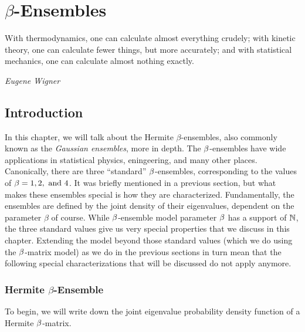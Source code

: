 
\chapter{$\beta$-Ensembles}

\epigraph{With thermodynamics, one can calculate almost everything crudely; with kinetic theory, one can calculate fewer things, but more accurately;
and with statistical mechanics, one can calculate almost nothing exactly.}{\textit{Eugene Wigner}}

\section{Introduction}

In this chapter, we will talk about the Hermite $\beta$-ensembles, also commonly known as the \textit{Gaussian ensembles}, more in depth.
The $\beta$-ensembles have wide applications in statistical physics, eningeering, and many other places.
Canonically, there are three ``standard'' $\beta$-ensembles, corresponding to the values of $\beta = 1, 2, \text{ and } 4$.
It was briefly mentioned in a previous section, but what makes these ensembles special is how they are characterized.
Fundamentally, the ensembles are defined by the joint density of their eigenvalues, dependent on the parameter $\beta$ of course.
While $\beta$-ensemble model parameter $\beta$ has a support of $\mathbb{N}$, the three standard values give us very special properties that we discuss in this chapter.
Extending the model beyond those standard values (which we do using the $\beta$-matrix model) as we do in the previous sections in turn mean that the following special characterizations
that will be discussed do not apply anymore.

\newpage
\subsection{Hermite $\beta$-Ensemble}

To begin, we will write down the joint eigenvalue probability density function of a Hermite $\beta$-matrix.

